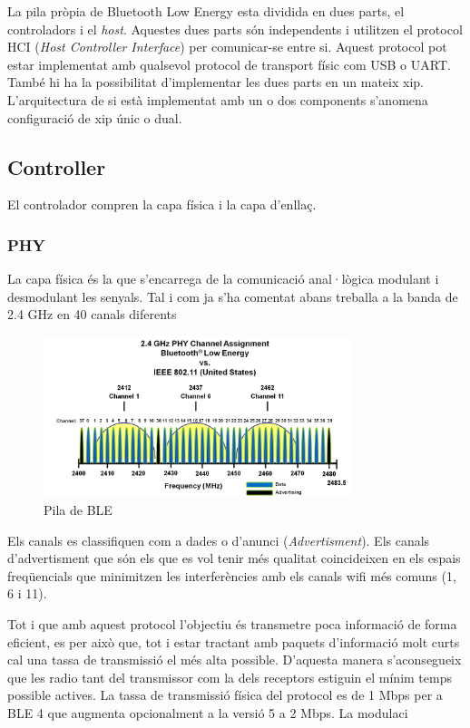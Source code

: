 La pila pròpia de Bluetooth Low Energy esta dividida en dues parts, el controladors i el \textit{host}. Aquestes dues parts són independents i utilitzen el protocol HCI (\textit{Host Controller Interface}) per comunicar-se entre si. Aquest protocol pot estar implementat amb qualsevol protocol de transport físic com USB o UART. També hi ha la possibilitat d'implementar les dues parts en un mateix xip. L'arquitectura de si està implementat amb un o dos components s'anomena configuració de xip únic o dual.


\subsection{Controller}
El controlador compren la capa física i la capa d'enllaç.

\subsubsection{PHY}
La capa física és la que s'encarrega de la comunicació anal·lògica modulant i desmodulant les senyals.
Tal i com ja s'ha comentat abans treballa a la banda de 2.4 GHz en 40 canals diferents

\begin{figure}[h!]
	\begin{center}
		\includegraphics[width=0.8\textwidth]{./images/ble_channel_assignment.png}
		\caption{Pila de BLE \cite{ble_stack}}
		\label{ble_stack}
	\end{center}
\end{figure}

Els canals es classifiquen com a dades o d'anunci (\textit{Advertisment}). Els canals d'advertisment que són els que es vol tenir més qualitat coincideixen en els espais freqüencials que minimitzen les interferències amb els canals wifi més comuns (1, 6 i 11).

Tot i que amb aquest protocol l'objectiu és transmetre poca informació de forma eficient, es per això que, tot i estar tractant amb paquets d'informació molt curts cal una tassa de transmissió el més alta possible. D'aquesta manera s'aconsegueix que les radio tant del transmissor com la dels receptors estiguin el mínim temps possible actives.
La tassa de transmissió física del protocol es de 1 Mbps per a BLE 4 que augmenta opcionalment a la versió 5 a 2 Mbps.
La modulaci

